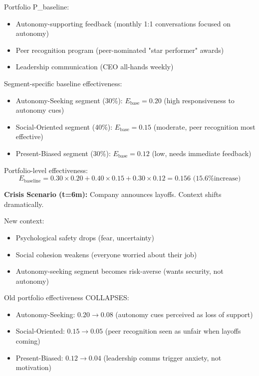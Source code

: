 Portfolio P_baseline:
\begin{itemize}[nosep]
\item Autonomy-supporting feedback (monthly 1:1 conversations focused on autonomy)
\item Peer recognition program (peer-nominated "star performer" awards)
\item Leadership communication (CEO all-hands weekly)
\end{itemize}

Segment-specific baseline effectiveness:
\begin{itemize}[nosep]
\item Autonomy-Seeking segment (30\%): $E_{\text{base}} = 0.20$ (high responsiveness to autonomy cues)
\item Social-Oriented segment (40\%): $E_{\text{base}} = 0.15$ (moderate, peer recognition most effective)
\item Present-Biased segment (30\%): $E_{\text{base}} = 0.12$ (low, needs immediate feedback)
\end{itemize}

Portfolio-level effectiveness:
\begin{equation}
E_{\text{baseline}} = 0.30 \times 0.20 + 0.40 \times 0.15 + 0.30 \times 0.12 = 0.156 \text{ (15.6\% increase)}
\label{eq:21-engagement-baseline}
\end{equation}

\textbf{Crisis Scenario (t=6m):} Company announces layoffs. Context shifts dramatically.

New context:
\begin{itemize}[nosep]
\item Psychological safety drops (fear, uncertainty)
\item Social cohesion weakens (everyone worried about their job)
\item Autonomy-seeking segment becomes risk-averse (wants security, not autonomy)
\end{itemize}

Old portfolio effectiveness COLLAPSES:
\begin{itemize}[nosep]
\item Autonomy-Seeking: $0.20 \to 0.08$ (autonomy cues perceived as loss of support)
\item Social-Oriented: $0.15 \to 0.05$ (peer recognition seen as unfair when layoffs coming)
\item Present-Biased: $0.12 \to 0.04$ (leadership comms trigger anxiety, not motivation)
\end{itemize}

